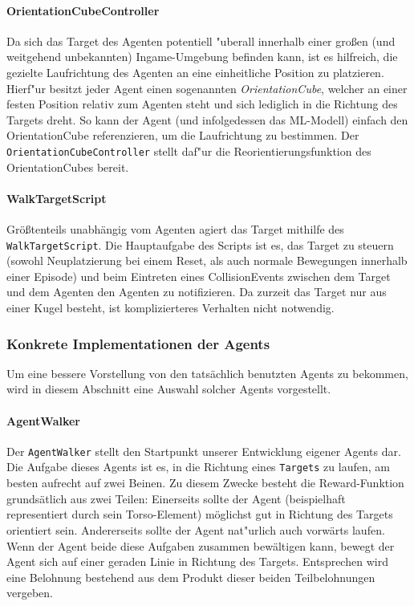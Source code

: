 \paragraph{OrientationCubeController}

Da sich das Target des Agenten potentiell "uberall innerhalb einer großen (und weitgehend unbekannten) Ingame-Umgebung befinden kann, ist es hilfreich, die gezielte Laufrichtung des Agenten an eine einheitliche Position zu platzieren. Hierf"ur besitzt jeder Agent einen sogenannten \textit{OrientationCube}, welcher an einer festen Position relativ zum Agenten steht und sich lediglich in die Richtung des Targets dreht. So kann der Agent (und infolgedessen das ML-Modell) einfach den OrientationCube referenzieren, um die Laufrichtung zu bestimmen. Der \texttt{OrientationCubeController} stellt daf"ur die Reorientierungsfunktion des OrientationCubes bereit.


\paragraph{WalkTargetScript}

Größtenteils unabhängig vom Agenten agiert das Target mithilfe des \texttt{WalkTargetScript}. Die Hauptaufgabe des Scripts ist es, das Target zu steuern (sowohl Neuplatzierung bei einem Reset, als auch normale Bewegungen innerhalb einer Episode) und beim Eintreten eines CollisionEvents zwischen dem Target und dem Agenten den Agenten zu notifizieren. Da zurzeit das Target nur aus einer Kugel besteht, ist komplizierteres Verhalten nicht notwendig.

\subsubsection{Konkrete Implementationen der Agents}
\label{sec:konkretAgents}

Um eine bessere Vorstellung von den tatsächlich benutzten Agents zu bekommen, wird in diesem Abschnitt eine Auswahl solcher Agents vorgestellt. 

\paragraph{AgentWalker}

Der \texttt{AgentWalker} stellt den Startpunkt unserer Entwicklung eigener Agents dar. Die Aufgabe dieses Agents ist es, in die Richtung eines \texttt{Targets} zu laufen, am besten aufrecht auf zwei Beinen. Zu diesem Zwecke besteht die Reward-Funktion grundsätlich aus zwei Teilen: Einerseits sollte der Agent (beispielhaft representiert durch sein Torso-Element) möglichst gut in Richtung des Targets orientiert sein. Andererseits sollte der Agent nat"urlich auch vorwärts laufen. Wenn der Agent beide diese Aufgaben zusammen bewältigen kann, bewegt der Agent sich auf einer geraden Linie in Richtung des Targets. Entsprechen wird eine Belohnung bestehend aus dem Produkt dieser beiden Teilbelohnungen vergeben.

